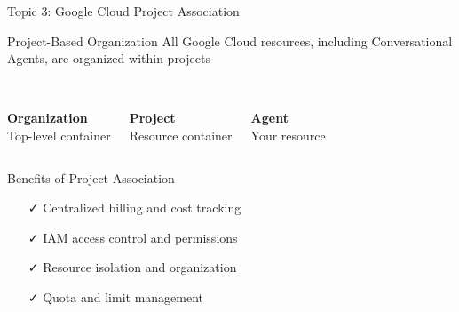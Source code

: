 \documentclass[aspectratio=169]{beamer}
\begin{document}
\begin{frame}{Topic 3: Google Cloud Project Association}
    \begin{block}{Project-Based Organization}
        All Google Cloud resources, including Conversational Agents, are organized within projects
    \end{block}
    
    \begin{columns}
        \begin{center}
            \textcolor{googleblue}{\Huge\faFolder}\\
            \textbf{Organization}\\
            \small Top-level container
        \end{center}
        
        \begin{center}
            \textcolor{googleyellow}{\Huge\faProjectDiagram}\\
            \textbf{Project}\\
            \small Resource container
        \end{center}
        
        \begin{center}
            \textcolor{googlegreen}{\Huge\faRobot}\\
            \textbf{Agent}\\
            \small Your resource
        \end{center}
    \end{columns}
    
    \vspace{1em}
    
    \begin{block}{Benefits of Project Association}
        \begin{itemize}
            \item[\textcolor{googlegreen}{\faCheck}] Centralized billing and cost tracking
            \item[\textcolor{googlegreen}{\faCheck}] IAM access control and permissions
            \item[\textcolor{googlegreen}{\faCheck}] Resource isolation and organization
            \item[\textcolor{googlegreen}{\faCheck}] Quota and limit management
        \end{itemize}
    \end{block}
\end{frame}
\end{document}
